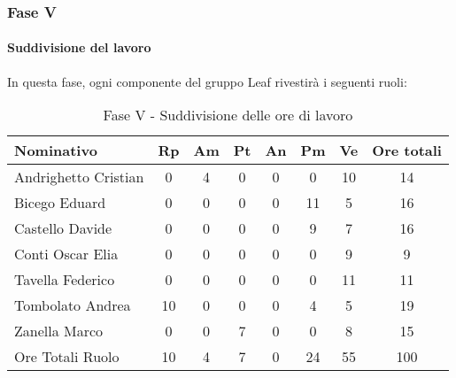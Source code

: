 \documentclass[../PianoProgetto.tex]{subfiles}
\begin{document}
	\subsubsection{Fase V}
				\paragraph{Suddivisione del lavoro}
					In questa fase, ogni componente del gruppo Leaf rivestirà i seguenti ruoli:
	
					\begin{table}[h]
		\centering
	
		\begin{tabular}{l * {7}{c}}
			\toprule
			Nominativo & Rp & Am & Pt & An & Pm & Ve & Ore totali \\
			\midrule
			Andrighetto Cristian & 0 & 4 & 0 & 0 & 0 & 10 & 14 \\
			\midrule
			Bicego Eduard & 0 & 0 &	0 &	0 &	11 & 5 & 16 \\
			\midrule
			Castello Davide & 0 & 0 & 0 & 0 & 9 & 7 & 16 \\
			\midrule
			Conti Oscar Elia &0 & 0 & 0 & 0 & 0 & 9 & 9 \\
			\midrule
			Tavella Federico &	0 & 0 & 0 & 0 & 0 & 11 & 11 \\
			\midrule
			Tombolato Andrea & 10 & 0 & 0 & 0 & 4 & 5 & 19 \\
			\midrule
			Zanella Marco & 0 & 0 & 7 & 0 & 0 & 8 & 15 \\
			\midrule			
			Ore Totali Ruolo & 10 & 4 &	7 &	0 &	24 & 55 & 100 \\
			\bottomrule
			
		\end{tabular}
		
		\caption{Fase V - Suddivisione delle ore di lavoro}
		\label{tab:faseV_ore}
		
	\end{table}
	
\end{document}

